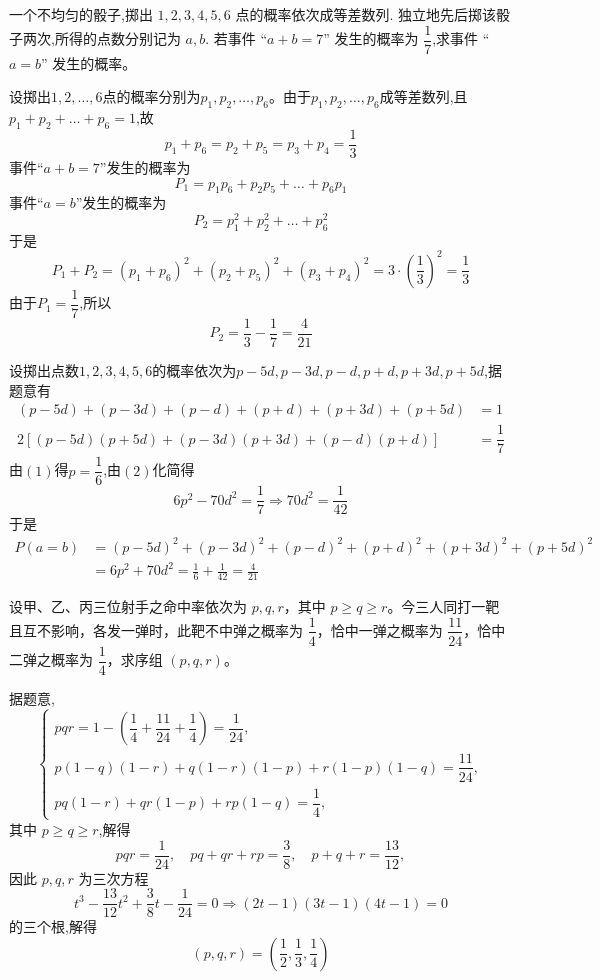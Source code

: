 \begin{questions}
    \question  一个不均匀的骰子,掷出 $1,2,3,4,5,6$ 点的概率依次成等差数列. 独立地先后掷该骰子两次,所得的点数分别记为 $a,b$. 若事件 “$a+b=7$” 发生的概率为 $\dfrac{1}{7}$,求事件 “$a=b$” 发生的概率。 
    \begin{solution}     
        设掷出$1,2,\dots,6$点的概率分别为$p_1,p_2,\dots,p_6$。由于$p_1,p_2,\dots,p_6$成等差数列,且$p_1+p_2+\dots+p_6=1$,故
        \[
        p_1+p_6=p_2+p_5=p_3+p_4=\frac{1}{3}
        \]
        事件“$a+b=7$”发生的概率为
        \[
        P_1=p_1p_6+p_2p_5+\dots+p_6p_1
        \]
        事件“$a=b$”发生的概率为
        \[
        P_2=p_1^2+p_2^2+\dots+p_6^2
        \]
        于是
        \[
        P_1+P_2=(p_1+p_6)^2+(p_2+p_5)^2+(p_3+p_4)^2=3\cdot\left(\frac{1}{3}\right)^2=\frac{1}{3}
        \]
        由于$P_1=\dfrac{1}{7}$,所以
        \[
        P_2=\frac{1}{3}-\frac{1}{7}=\frac{4}{21}
        \]
    \end{solution}
    \begin{solution}
        设掷出点数$1,2,3,4,5,6$的概率依次为$p-5d,p-3d,p-d,p+d,p+3d,p+5d$,据题意有
        \begin{align}
        (p-5d)+(p-3d)+(p-d)+(p+d)+(p+3d)+(p+5d)&=1 \tag{1}\\
        2[(p-5d)(p+5d)+(p-3d)(p+3d)+(p-d)(p+d)]&=\dfrac{1}{7} \tag{2} 
        \end{align} 
        由$(1)$得$p=\dfrac{1}{6}$,由$(2)$化简得
        \[
        6p^2 - 70 d^2 = \frac{1}{7} \Rightarrow 70d^2=\frac{1}{42}
        \] 
        于是
        \begin{align*}
            P(a=b)&=(p-5d)^2+(p-3d)^2+(p-d)^2+(p+d)^2+(p+3d)^2+(p+5d)^2 \\
            &=6p^2+70d^2 =\frac{1}{6}+\frac{1}{42}=\frac{4}{21}
        \end{align*}
    \end{solution}

    \question 设甲、乙、丙三位射手之命中率依次为 $p,q,r$，其中 $p\ge q\ge r$。今三人同打一靶且互不影响，各发一弹时，此靶不中弹之概率为 $\dfrac{1}{4}$，恰中一弹之概率为 $\dfrac{11}{24}$，恰中二弹之概率为 $\dfrac{1}{4}$，求序组 $(p,q,r)$。
    \begin{solution} 
        据题意,
        \[
        \begin{cases}
        pqr=1-\left(\dfrac{1}{4}+\dfrac{11}{24}+\dfrac{1}{4}\right)=\dfrac{1}{24}, \\[2pt]
        p(1-q)(1-r)+q(1-r)(1-p)+r(1-p)(1-q)=\dfrac{11}{24}, \\[2pt]
        pq(1-r)+qr(1-p)+rp(1-q)=\dfrac{1}{4},
        \end{cases}
        \]
        其中 $p\ge q\ge r$,解得
        \[
        pqr=\frac{1}{24},\quad pq+qr+rp=\frac{3}{8},\quad p+q+r=\frac{13}{12},
        \]
        因此 $p,q,r$ 为三次方程
        \[
        t^3-\frac{13}{12}t^2+\frac{3}{8}t-\frac{1}{24}=0 \Rightarrow (2t-1)(3t-1)(4t-1)=0
        \]
        的三个根,解得
        \[
        (p,q,r)=\left(\frac{1}{2},\frac{1}{3},\frac{1}{4}\right)
        \]
    \end{solution}


\end{questions}
